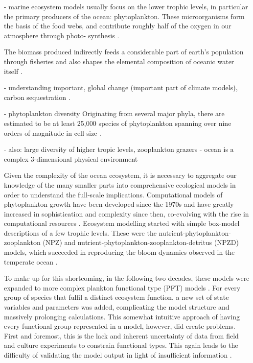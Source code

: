\documentclass[journal abbreviation, manuscript]{copernicus}
\begin{document}
- marine ecosystem models usually focus on the lower trophic levels, in particular the primary producers of the ocean: phytoplankton.
These microorganisms form the basis of the food webs, and contribute roughly half of the oxygen in our atmosphere through photo- synthesis \citep{Field2009}.

The biomass produced indirectly feeds a considerable part of earth’s population through fisheries \citep{Stock2017} and also shapes the elemental composition of oceanic water itself \citep{Redfield1958}.

- understanding important, global change (important part of climate models), carbon sequestration \citep{Honjo2008}.

- phytoplankton diversity 
Originating from several major phyla, there are estimated to be at least 25,000 species of phytoplankton \citep{Falkowski2004a} spanning over nine orders of magnitude in cell size \citep{Sieburth1978PelagicFractions, Finkel2010}.

- also: large diversity of higher tropic levels, zooplankton grazers
- ocean is a complex 3-dimensional physical environment


Given the complexity of the ocean ecosystem, it is necessary to aggregate our knowledge of the many smaller parts into comprehensive ecological models in order to understand the full-scale implications. Computational models of phytoplankton growth have been developed since the 1970s and have greatly increased in sophistication and complexity since then, co-evolving with the rise in computational resources \citep{Gentleman2003a}. Ecosystem modelling started with simple box-model descriptions of a few trophic levels. These were the nutrient-phytoplankton-zooplankton (NPZ) and nutrient-phytoplankton-zooplankton-detritus (NPZD) models, which succeeded in reproducing the bloom dynamics observed in the temperate ocean \citep{Evans1985ACycles, Fasham1990a}. 

To make up for this shortcoming, in the following two decades, these models were expanded to more complex plankton functional type (PFT) models \citep{LeQuere2005}. For every group of species that fulfil a distinct ecosystem function, a new set of state variables and parameters was added, complicating the model structure and massively prolonging calculations. This somewhat intuitive approach of having every functional group represented in a model, however, did create problems. First and foremost, this is the lack and inherent uncertainty of data from field and culture experiments to constrain functional types. This again leads to the difficulty of validating the model output in light of insufficient information \citep{Shimoda2016}.
\end{document}
